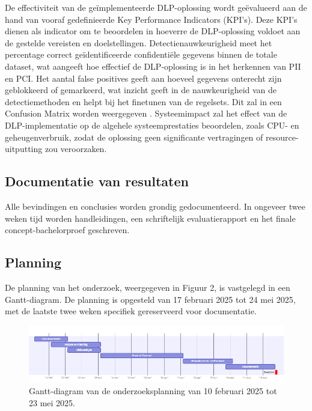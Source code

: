 De effectiviteit van de geïmplementeerde DLP-oplossing wordt geëvalueerd aan de hand van vooraf gedefinieerde Key Performance Indicators (KPI's). 
Deze KPI's dienen als indicator om te beoordelen in hoeverre de DLP-oplossing voldoet aan de gestelde vereisten en doelstellingen.
Detectienauwkeurigheid meet het percentage correct geïdentificeerde confidentiële gegevens binnen de totale dataset, 
wat aangeeft hoe effectief de DLP-oplossing is in het herkennen van PII en PCI. 
Het aantal false positives geeft aan hoeveel gegevens onterecht zijn geblokkeerd of gemarkeerd, 
wat inzicht geeft in de nauwkeurigheid van de detectiemethoden en helpt bij het finetunen van de regelsets. 
Dit zal in een Confusion Matrix worden weergegeven \autocite{Microsoftn.d.}.
Systeemimpact zal het effect van de DLP-implementatie op de algehele systeemprestaties beoordelen, zoals CPU- en 
geheugenverbruik, zodat de oplossing geen significante vertragingen of resource-uitputting zou veroorzaken.

\subsection{Documentatie van resultaten}%

Alle bevindingen en conclusies worden grondig gedocumenteerd. 
In ongeveer twee weken tijd worden handleidingen, een schriftelijk evaluatierapport en het finale concept-bachelorproef geschreven.

\subsection{Planning}%
\label{sec:planning}

De planning van het onderzoek, weergegeven in Figuur 2, is vastgelegd in een Gantt-diagram. De planning is opgesteld van 17 februari 2025 tot 24 mei 2025, met de laatste twee weken specifiek gereserveerd voor documentatie.

\begin{figure}
    \centering
    \includegraphics[scale=0.50]
    {img/gantt.png}
    \caption{\label{fig:gant}Gantt-diagram van de onderzoeksplanning van 10 februari 2025 tot 23 mei 2025.}
  \end{figure}

